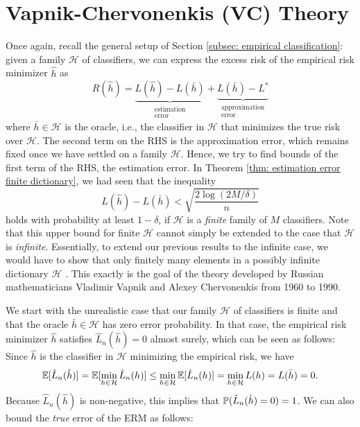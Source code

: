 \chapter{Vapnik-Chervonenkis (VC) Theory}
\label{ch: VC theory}

Once again, recall the general setup of Section \ref{subsec: empirical classification}: given a family $\mathcal{H}$ of classifiers, we can express the excess risk of the empirical risk minimizer $\hat{h}$ as
\[
    R(\hat{h}) = \underbrace{L(\hat{h}) - L(\bar{h})}_{\substack{\text{estimation} \\ \text{error}}} + \underbrace{L(\bar{h}) - L^*}_{\substack{\text{approximation} \\ \text{error}}}
\]
where $\bar{h} \in \mathcal{H}$ is the oracle, i.e., the classifier in $\mathcal{H}$ that minimizes the true risk over $\mathcal{H}$. The second term on the RHS is the approximation error, which remains fixed once we have settled on a family $\mathcal{H}$. Hence, we try to find bounds of the first term of the RHS, the estimation error. In Theorem \ref{thm: estimation error finite dictionary}, we had seen that the inequality
\[
    L(\hat{h}) - L(\bar{h}) < \sqrt{\frac{2 \log(2M / \delta)}{n}}
\]
holds with probability at least $1 - \delta$, if $\mathcal{H}$ is a \emph{finite} family of $M$ classifiers. Note that this upper bound for finite $\mathcal{H}$ cannot simply be extended to the case that $\mathcal{H}$ is \emph{infinite}. Essentially, to extend our previous results to the infinite case, we would have to show that only finitely many elements in a possibly infinite dictionary $\mathcal{H}$ . This exactly is the goal of the theory developed by Russian mathematicians Vladimir Vapnik and Alexey Chervonenkis from 1960 to 1990.

We start with the unrealistic case that our family $\mathcal{H}$ of classifiers is finite and that the oracle $\bar{h} \in \mathcal{H}$ has zero error probability. In that case, the empirical risk minimizer $\hat{h}$ satisfies $\hat{L}_n(\hat{h}) = 0$ almost surely, which can be seen as follows: Since $\hat{h}$ is the classifier in $\mathcal{H}$ minimizing the empirical risk, we have
\[
    \Exp[\hat{L}_n(\hat{h})] = \Exp[\min_{h \in \mathcal{H}} \hat{L}_n(h)] \leq \min_{h \in \mathcal{H}} \Exp[\hat{L}_n(h)] = \min_{h \in \mathcal{H}} L(h) = L(\bar{h}) = 0.
\]
Because $\hat{L}_n(\hat{h})$ is non-negative, this implies that $\P(\hat{L}_n(\hat{h}) = 0) = 1$. We can also bound the \emph{true} error of the ERM as follows:

